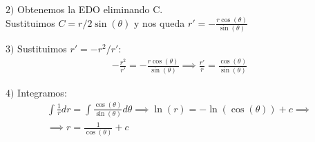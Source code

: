 \documentclass[nochap]{apuntes}
\begin{document}
\begin{problem}[11]
$2)$ Obtenemos la EDO eliminando C.\\
Sustituimos $C=r/2\sin(\theta)$ y nos queda $r'=-\frac{r\cos(\theta)}{\sin(\theta)}$

$3)$ Sustituimos  $r'=-r^2/r'$:
\begin{gather*}
-\frac{r^2}{r'}=-\frac{r\cos(\theta)}{\sin(\theta)} \implies \frac{r'}{r}=\frac{\cos(\theta)}{\sin(\theta)}
\end{gather*}

$4)$ Integramos:
\begin{gather*}
\int \frac{1}{r}dr=\int\frac{\cos(\theta)}{\sin(\theta)}d\theta \implies \ln(r)=-\ln(\cos(\theta))+c \implies \\ \implies r=\frac{1}{\cos(\theta)}+c
\end{gather*}

\end{problem}
\newpage
\end{document}
